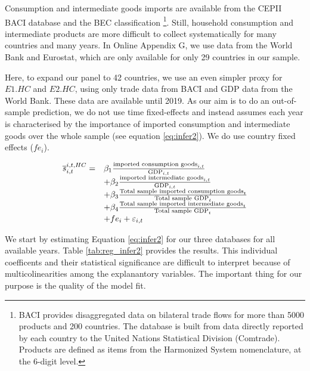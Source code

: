 \documentclass[11pt,a4paper]{paper} %
\begin{document}
Consumption and intermediate goods imports are available from the CEPII BACI database and the BEC classification \citep{Gaulier2010}\footnote{BACI provides disaggregated data on bilateral trade flows for more than 5000 products and 200 countries. The database is built from data directly reported by each country to the United Nations Statistical Division (Comtrade). Products are defined as items from the Harmonized System nomenclature, at the 6-digit level.}.
Still, household consumption and intermediate products are more difficult to collect systematically for many countries and many years. In Online Appendix G, we use data from the World Bank and Eurostat, which are only available for only 29 countries in our sample.

Here, to expand our panel to 42 countries, we use an even simpler proxy for $E1.HC$ and $E2.HC$, using only trade data from BACI and GDP data from the World Bank.
These data are available until 2019. 
As our aim is to do an out-of-sample prediction, we do not use time fixed-effects and instead assumes each year is characterised by the importance of imported consumption and intermediate goods over the whole sample (see equation \ref{eq:infer2}).
We do use country fixed effects ($fe_{i}$).

 \begin{equation}
	\begin{array}{llll}
		\overline{s}_{i,t}^{i,t,HC}=  &  \beta_1  \frac{\textnormal{imported consumption goods}_{i,t}}{\textnormal{GDP}_{i,t}} \\ & + \beta_2 \frac{\textnormal{imported intermediate goods}_{i,t}}{\textnormal{GDP}_{i,t}} \\
		& +  \beta_3  \frac{\textnormal{Total sample imported consumption goods}_{t}}{\textnormal{Total sample GDP}_{t}} \\
		& + \beta_4 \frac{\textnormal{Total sample imported intermediate goods}_{t}}{\textnormal{Total sample GDP}_{t}} \\
		& +fe_{i}+\varepsilon_{i,t}
	\end{array}
	\label{eq:infer2}
\end{equation}

We start by estimating Equation \ref{eq:infer2} for our three databases for all available years.
Table \ref{tab:reg_infer2} provides the results.
This individual coefficents and their statistical significance are difficult to interpret because of multicolinearities among the explanantory variables.
The important thing for our purpose is the quality of the model fit.
\end{document}
